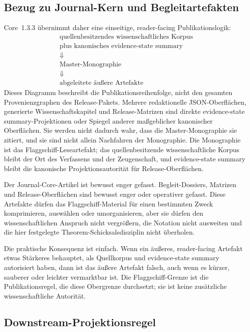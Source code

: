 \subsection{Bezug zu Journal-Kern und Begleitartefakten}

Core~1.3.3 übernimmt daher eine einseitige, reader-facing Publikationslogik:
\[
\begin{gathered}
\text{quellenbesitzendes wissenschaftliches Korpus}\\
\text{plus kanonisches evidence-state summary}\\
\Downarrow\\
\text{Master-Monographie}\\
\Downarrow\\
\text{abgeleitete äußere Artefakte}
\end{gathered}
\]
Dieses Diagramm beschreibt die Publikationsreihenfolge, nicht den gesamten
Provenienzgraphen des Release-Pakets. Mehrere redaktionelle JSON-Oberflächen,
generierte Wissenschaftskapitel und Release-Matrizen sind direkte
evidence-state summary-Projektionen oder Spiegel anderer maßgeblicher kanonischer Oberflächen.
Sie werden nicht dadurch wahr, dass die Master-Monographie sie zitiert, und
sie sind nicht allein Nachfahren der Monographie. Die Monographie ist das
Flaggschiff-Leseartefakt; das quellenbesitzende wissenschaftliche Korpus bleibt
der Ort des Verfassens und der Zeugenschaft, und evidence-state summary bleibt die kanonische
Projektionsautorität für Release-Oberflächen.

Der Journal-Core-Artikel ist bewusst enger gefasst. Begleit-Dossiers,
Matrizen und Release-Oberflächen sind bewusst enger oder operativer gefasst.
Diese Artefakte dürfen das Flaggschiff-Material für einen bestimmten Zweck
komprimieren, auswählen oder umorganisieren, aber sie dürfen den
wissenschaftlichen Anspruch nicht vergrößern, die Notation nicht ausweiten und
die hier festgelegte Theorem-Schicksalsdisziplin nicht überholen.

Die praktische Konsequenz ist einfach. Wenn ein äußeres,
reader-facing Artefakt etwas Stärkeres behauptet, als Quellkorpus und evidence-state summary
autorisiert haben, dann ist das äußere Artefakt falsch, auch wenn es kürzer,
sauberer oder leichter vermarktbar ist. Die Flaggschiff-Grenze ist die
Publikationsregel, die diese Obergrenze durchsetzt; sie ist keine zusätzliche
wissenschaftliche Autorität.

\subsection{Downstream-Projektionsregel}

